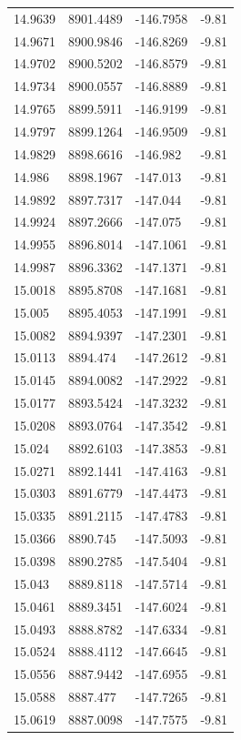 \begin{table}[H]
\begin{tabular}{llll}
14.9639 & 8901.4489 & -146.7958 & -9.81 \\
14.9671 & 8900.9846 & -146.8269 & -9.81 \\
14.9702 & 8900.5202 & -146.8579 & -9.81 \\
14.9734 & 8900.0557 & -146.8889 & -9.81 \\
14.9765 & 8899.5911 & -146.9199 & -9.81 \\
14.9797 & 8899.1264 & -146.9509 & -9.81 \\
14.9829 & 8898.6616 & -146.982 & -9.81 \\
14.986 & 8898.1967 & -147.013 & -9.81 \\
14.9892 & 8897.7317 & -147.044 & -9.81 \\
14.9924 & 8897.2666 & -147.075 & -9.81 \\
14.9955 & 8896.8014 & -147.1061 & -9.81 \\
14.9987 & 8896.3362 & -147.1371 & -9.81 \\
15.0018 & 8895.8708 & -147.1681 & -9.81 \\
15.005 & 8895.4053 & -147.1991 & -9.81 \\
15.0082 & 8894.9397 & -147.2301 & -9.81 \\
15.0113 & 8894.474 & -147.2612 & -9.81 \\
15.0145 & 8894.0082 & -147.2922 & -9.81 \\
15.0177 & 8893.5424 & -147.3232 & -9.81 \\
15.0208 & 8893.0764 & -147.3542 & -9.81 \\
15.024 & 8892.6103 & -147.3853 & -9.81 \\
15.0271 & 8892.1441 & -147.4163 & -9.81 \\
15.0303 & 8891.6779 & -147.4473 & -9.81 \\
15.0335 & 8891.2115 & -147.4783 & -9.81 \\
15.0366 & 8890.745 & -147.5093 & -9.81 \\
15.0398 & 8890.2785 & -147.5404 & -9.81 \\
15.043 & 8889.8118 & -147.5714 & -9.81 \\
15.0461 & 8889.3451 & -147.6024 & -9.81 \\
15.0493 & 8888.8782 & -147.6334 & -9.81 \\
15.0524 & 8888.4112 & -147.6645 & -9.81 \\
15.0556 & 8887.9442 & -147.6955 & -9.81 \\
15.0588 & 8887.477 & -147.7265 & -9.81 \\
15.0619 & 8887.0098 & -147.7575 & -9.81 \\

\end{tabular}
\end{table}
